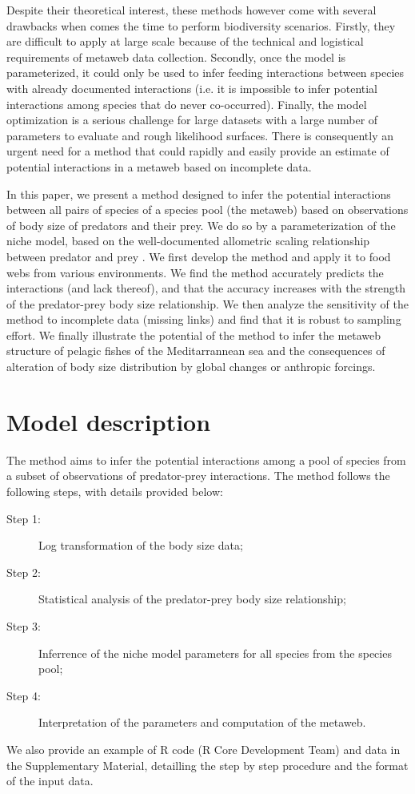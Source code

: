 \documentclass[12pt]{article}
\begin{document}
Despite their theoretical interest, these methods however come with several drawbacks when comes the time to perform biodiversity scenarios. Firstly, they are difficult to apply at large scale because of the technical and logistical requirements of metaweb data collection. Secondly, once the model is parameterized, it could only be used to infer feeding interactions between species with already documented interactions (i.e. it is impossible to infer potential interactions among species that do never co-occurred). Finally, the model optimization is a serious challenge for large datasets with a large number of parameters to evaluate and rough likelihood surfaces. There is consequently an urgent need for a method that could rapidly and easily provide an estimate of potential interactions in a metaweb based on incomplete data. 

In this paper, we present a method designed to infer the potential interactions between all pairs of species of a species pool (the metaweb) based on observations of body size of predators and their prey. We do so by a parameterization of the niche model, based on the well-documented allometric scaling relationship between predator and prey \parencite{Cohen2003, Brose2006, Riede2010}. We first develop the method and apply it to food webs from various environments. We find the method accurately predicts the interactions (and lack thereof), and that the accuracy increases with the strength of the predator-prey body size relationship. We then analyze the sensitivity of the method to incomplete data (missing links) and find that it is robust to sampling effort. We finally illustrate the potential of the method to infer the metaweb structure of pelagic fishes of the Meditarrannean sea and the consequences of alteration of body size distribution by global changes or anthropic forcings. 

\section{Model description}

The method aims to infer the potential interactions among a pool of species from a subset of observations of predator-prey interactions. The method follows the following steps, with details provided below: 
\begin{description}
\item[Step 1:] Log transformation of the body size data;
\item[Step 2:] Statistical analysis of the predator-prey body size relationship;
\item[Step 3:] Inferrence of the niche model parameters for all species from the species pool;
\item[Step 4:] Interpretation of the parameters and computation of the metaweb.
\end{description}
We also provide an example of R code (R Core Development Team) and data in the Supplementary Material, detailling the step by step procedure and the format of the input data. 
\end{document}
